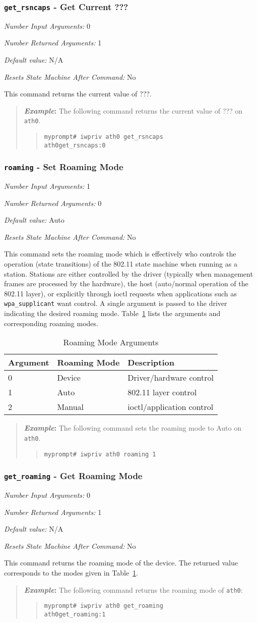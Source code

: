 \documentclass[10pt,fullpage]{article}
\newcommand{\mytt}[1]{{\texttt{#1}}}
\newcommand{\bv}{\begin{verse}}
\newcommand{\ev}{\end{verse}}
\newcommand{\cmd}[1]{{\texttt{myprompt\# #1}}}
\newcommand{\argdesc}[4]{\begin{description}
\itemsep -6pt
\item \textit{Number Input Arguments:} #1
\item \textit{Number Returned Arguments:} #2
\item \textit{Default value:} #3
\item \textit{Resets State Machine After Command:} #4
\end{description}
}
\newenvironment{example}{\begin{quote}\textbf{\textit{Example}:}}{\end{quote}}
\begin{document}
\subsubsection{\mytt{get\_rsncaps} - Get Current ???}
\argdesc{0}{1}{N/A}{No}
This command returns the current value of ???.
\begin{example}
  The following command returns the current value of ??? on
  \mytt{ath0}.
  \bv
  \cmd{iwpriv ath0 get\_rsncaps}\\
  \mytt{ath0\hspace{32pt}get\_rsncaps:0}
  \ev
\end{example}

\subsubsection{\mytt{roaming} - Set Roaming Mode}
\argdesc{1}{0}{Auto}{No}
This command sets the roaming mode which is effectively who controls
the operation (state transitions) of the 802.11 state machine when
running as a station.  Stations are either controlled by the driver
(typically when management frames are processed by the hardware), the
host (auto/normal operation of the 802.11 layer), or explicitly
through ioctl requests when applications such as
\mytt{wpa\_supplicant} want control. A single argument is passed to
the driver indicating the desired roaming mode.
Table~\ref{tab:roaming} lists the arguments and corresponding roaming
modes.
\begin{table}[h*]
  \centering
  \begin{tabular}{|l|l|l|} \hline
    Argument & Roaming Mode & Description \\ \hline
    0 & Device & Driver/hardware control \\
    1 & Auto & 802.11 layer control \\
    2 & Manual & ioctl/application control \\ \hline
  \end{tabular}
  \caption{Roaming Mode Arguments}
  \label{tab:roaming}
\end{table}
\begin{example}
  The following command sets the roaming mode to Auto on \mytt{ath0}.
  \bv
  \cmd{iwpriv ath0 roaming 1}
  \ev
\end{example}

\subsubsection{\mytt{get\_roaming} - Get Roaming Mode}
\argdesc{0}{1}{N/A}{No}
This command returns the roaming mode of the device.  The returned
value corresponds to the modes given in Table~\ref{tab:roaming}.
\begin{example}
  The following command returns the roaming mode of \mytt{ath0}:
  \bv
  \cmd{iwpriv ath0 get\_roaming}\\
  \mytt{ath0\hspace{32pt}get\_roaming:1}
  \ev
\end{example}
\end{document}
